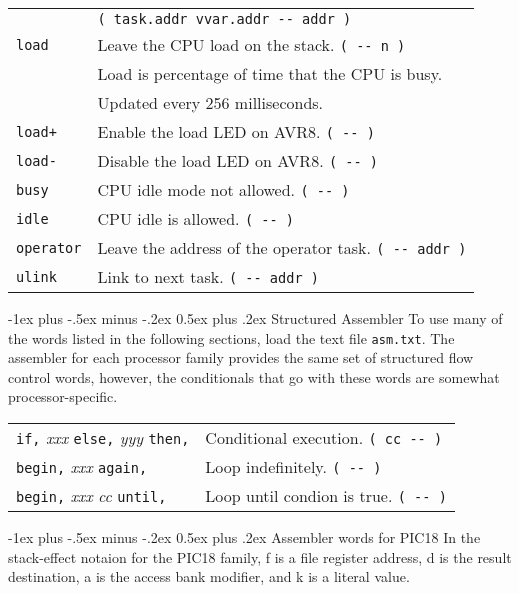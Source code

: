 \documentclass[10pt,landscape,a4paper]{article}
\makeatletter
\renewcommand{\section}{\@startsection{section}{1}{0mm}%
                                {-1ex plus -.5ex minus -.2ex}%
                                {0.5ex plus .2ex}%
                                {\normalfont\large\bfseries}}
\makeatother
\begin{document}
\begin{multicols}{3}
\begin{tabular}{@{}ll@{}}
            & \verb!( task.addr vvar.addr -- addr )! \\
\verb!load!  & Leave the CPU load on the stack. \verb!( -- n )! \\
             & Load is percentage of time that the CPU is busy. \\
             & Updated every 256 milliseconds. \\
\verb!load+! & Enable the load LED on AVR8. \verb!( -- )! \\
\verb!load-! & Disable the load LED on AVR8. \verb!( -- )! \\
\verb!busy!  & CPU idle mode not allowed. \verb!( -- )! \\
\verb!idle!  & CPU idle is allowed. \verb!( -- )! \\
\verb!operator!  & Leave the address of the operator task. \verb!( -- addr )! \\
\verb!ulink!  & Link to next task. \verb!( -- addr )! \\
\end{tabular}

\bigskip

\section{Structured Assembler}
To use many of the words listed in the following sections, load the text file \verb!asm.txt!.
The assembler for each processor family provides the same set of structured flow control words,
however, the conditionals that go with these words are somewhat processor-specific.\\
\begin{tabular}{@{}ll@{}}
\verb!if,! \textit{xxx} \verb!else,! \textit{yyy} \verb!then,! & Conditional execution. \verb!( cc -- )! \\
\verb!begin,! \textit{xxx} \verb!again,! & Loop indefinitely. \verb!( -- )! \\
\verb!begin,! \textit{xxx} \textit{cc} \verb!until,! & Loop until condion is true. \verb!( -- )! \\
\end{tabular}

\medskip

\section{Assembler words for PIC18}
In the stack-effect notaion for the PIC18 family, 
f is a file register address,
d is the result destination, 
a is the access bank modifier,
and k is a literal value.


\end{multicols}
\end{document}
